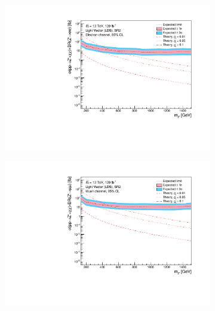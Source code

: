 \documentclass[12pt, a4paper]{book}
\begin{document}
\begin{figure}[!ht]
\begin{subfigure}[b]{0.49\textwidth}
   \end{subfigure}
   \hfill
   \begin{subfigure}[b]{0.49\textwidth}
      \centering
      \includegraphics[width=1\textwidth]{Limits/Model_independent/100-150/LV_LDS/mass_exclusion_ee.pdf}
   \end{subfigure}
   \hfill
   \begin{subfigure}[b]{0.49\textwidth}
      \centering
      \includegraphics[width=1\textwidth]{Limits/Model_independent/100-150/LV_LDS/mass_exclusion_uu.pdf}
   \end{subfigure}
   \hfill
	\begin{subfigure}[b]{0.49\textwidth}
      \centering

\end{subfigure}
\end{figure}
\end{document}
